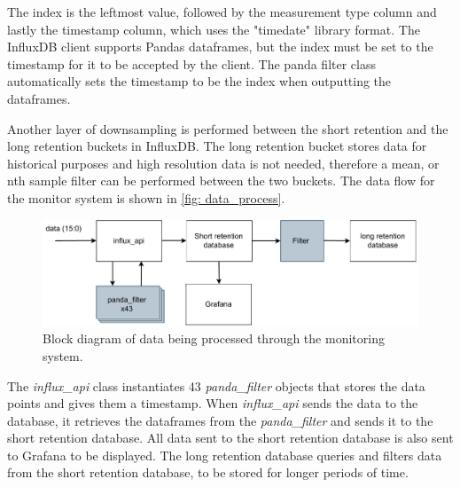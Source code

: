 \documentclass[main.tex]{subfiles}
\begin{document}
The index is the leftmost value, followed by the measurement type column and lastly the timestamp column, which uses the "timedate" library format. The InfluxDB client supports Pandas dataframes, but the index must be set to the timestamp for it to be accepted by the client. The panda filter class automatically sets the timestamp to be the index when outputting the dataframes.

Another layer of downsampling is performed between the short retention and the long retention buckets in InfluxDB. The long retention bucket stores data for historical purposes and high resolution data is not needed, therefore a mean, or nth sample filter can be performed between the two buckets. The data flow for the monitor system is shown in \autoref{fig: data_process}.

 \begin{figure}[!htpb]
    \centering
    \includegraphics[width=18cm, scale=1]{images/processing data overview.pdf}
    \caption{Block diagram of data being processed through the monitoring system.}
    \label{fig: data_process}
\end{figure}
\FloatBarrier 

The \textit{influx\_api} class instantiates 43 \textit{panda\_filter} objects that stores the data points and gives them a timestamp. When \textit{influx\_api} sends the data to the database, it retrieves the dataframes from the \textit{panda\_filter} and sends it to the short retention database. All data sent to the short retention database is also sent to Grafana to be displayed. The long retention database queries and filters data from the short retention database, to be stored for longer periods of time.

 

 
\end{document}
